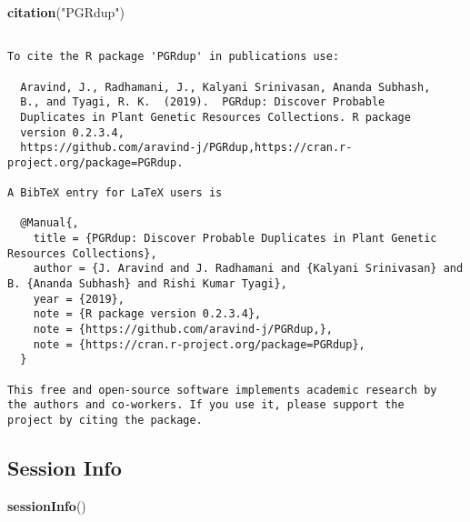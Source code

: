\documentclass[]{article}
\newenvironment{Shaded}{\begin{snugshade}}{\end{snugshade}}
\newcommand{\KeywordTok}[1]{\textcolor[rgb]{0.13,0.29,0.53}{\textbf{#1}}}
\newcommand{\NormalTok}[1]{#1}
\newcommand{\StringTok}[1]{\textcolor[rgb]{0.31,0.60,0.02}{#1}}
\begin{document}
\begin{Shaded}
\begin{Highlighting}[]
\KeywordTok{citation}\NormalTok{(}\StringTok{"PGRdup"}\NormalTok{)}
\end{Highlighting}
\end{Shaded}

\begin{verbatim}

To cite the R package 'PGRdup' in publications use:

  Aravind, J., Radhamani, J., Kalyani Srinivasan, Ananda Subhash,
  B., and Tyagi, R. K.  (2019).  PGRdup: Discover Probable
  Duplicates in Plant Genetic Resources Collections. R package
  version 0.2.3.4,
  https://github.com/aravind-j/PGRdup,https://cran.r-project.org/package=PGRdup.

A BibTeX entry for LaTeX users is

  @Manual{,
    title = {PGRdup: Discover Probable Duplicates in Plant Genetic Resources Collections},
    author = {J. Aravind and J. Radhamani and {Kalyani Srinivasan} and B. {Ananda Subhash} and Rishi Kumar Tyagi},
    year = {2019},
    note = {R package version 0.2.3.4},
    note = {https://github.com/aravind-j/PGRdup,},
    note = {https://cran.r-project.org/package=PGRdup},
  }

This free and open-source software implements academic research by
the authors and co-workers. If you use it, please support the
project by citing the package.
\end{verbatim}

\hypertarget{session-info}{%
\subsection{Session Info}\label{session-info}}

\begin{Shaded}
\begin{Highlighting}[]
\KeywordTok{sessionInfo}\NormalTok{()}
\end{Highlighting}
\end{Shaded}
\end{document}
